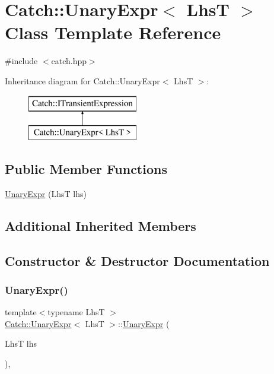 \hypertarget{class_catch_1_1_unary_expr}{}\section{Catch\+:\+:Unary\+Expr$<$ LhsT $>$ Class Template Reference}
\label{class_catch_1_1_unary_expr}


{\ttfamily \#include $<$catch.\+hpp$>$}

Inheritance diagram for Catch\+:\+:Unary\+Expr$<$ LhsT $>$\+:\begin{figure}[H]
\begin{center}
\leavevmode
\includegraphics[height=2.000000cm]{class_catch_1_1_unary_expr}
\end{center}
\end{figure}
\subsection*{Public Member Functions}
\begin{DoxyCompactItemize}
\item 
\mbox{\hyperlink{class_catch_1_1_unary_expr_ae02f666a1e64da728628aa2033e1d6e7}{Unary\+Expr}} (LhsT lhs)
\end{DoxyCompactItemize}
\subsection*{Additional Inherited Members}


\subsection{Constructor \& Destructor Documentation}
\mbox{\label{class_catch_1_1_unary_expr_ae02f666a1e64da728628aa2033e1d6e7}} 
\subsubsection{\texorpdfstring{Unary\+Expr()}{UnaryExpr()}}
{\footnotesize\ttfamily template$<$typename LhsT $>$ \\
\mbox{\hyperlink{class_catch_1_1_unary_expr}{Catch\+::\+Unary\+Expr}}$<$ LhsT $>$\+::\mbox{\hyperlink{class_catch_1_1_unary_expr}{Unary\+Expr}} (\begin{DoxyParamCaption}\item[{LhsT}]{lhs }\end{DoxyParamCaption})\hspace{0.3cm}{\ttfamily [inline]}, {\ttfamily [explicit]}}



